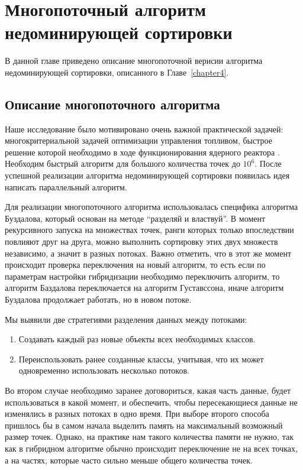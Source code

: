\chapter{Многопоточный алгоритм недоминирующей сортировки}
\label{chapter5}

В данной главе приведено описание многопоточной верисии алгоритма недоминирующей сортировки, описанного в Главе~\ref{chapter4}.

\section{Описание многопоточного алгоритма}

Наше исследование было мотивировано очень важной практической задачей: многокритериальной задачей оптимизации управления топливом, быстрое решение которой необходимо в ходе функционирования ядерного реактора \cite{Schlunz}. Необходим быстрый алгоритм для большого количества точек до $10^6$. После успешной реализации алгоритма недоминирующей сортировки появилась идея написать параллельный алгоритм. 

Для реализации многопоточного алгоритма использовалась специфика алгоритма Буздалова, который основан на методе ``разделяй и властвуй''.  В момент рекурсивного запуска на множествах точек, ранги которых только впоследствии повлияют друг на друга, можно выполнить сортировку этих двух множеств независимо, а значит в разных потоках. Важно отметить, что в этот же момент происходит проверка переключения на новый алгоритм, то есть если по параметрам настройки гибридизации необходимо переключить алгоритм, то алгоритм Баздалова переключается на алгоритм Густавссона, иначе алгоритм Буздалова продолжает работать, но в новом потоке. 

Мы выявили две стратегиями разделения данных между потоками:
\begin{enumerate}
    \item Создавать каждый раз новые объекты всех необходимых классов.
    \item Переиспользовать ранее созданные классы, учитывая, что их может одновременно использовать несколько потоков.
\end{enumerate}

Во втором случае необходимо заранее договориться, какая часть данные, будет использоваться в какой момент, и обеспечить, чтобы пересекающиеся данные не изменялись в разных потоках в одно время. При выборе второго способа пришлось бы в самом начала выделить память на максимальный возможный размер точек. Однако, на практике нам такого количества памяти не нужно, так как в гибридном алгоритме обычно происходит переключение не на всех точках, а на частях, которые часто сильно меньше общего количества точек.

